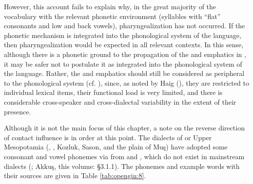\documentclass[output=paper]{langsci/langscibook}
\begin{document}
However, this account fails to explain why, in the great majority of the vocabulary with the relevant phonetic environment (syllables with “flat” consonants and low and back vowels), pharyngealization has not occurred. If the phonetic mechanism is integrated into the phonological system of the language, then pharyngealization would be expected in all relevant contexts. In this sense, although there is a phonetic ground to the propagation of the  and emphatics in , it may be safer not to postulate it as integrated into the phonological system of the language. Rather, the  and emphatics should still be considered as peripheral to the phonological system (cf. \citealt{Haig2007,Anonbyforthcoming}), since, as noted by Haig (\citeyear[167]{Haig2007}), they are restricted to individual lexical items, their functional load is very limited, and there is considerable cross-speaker and cross-dialectal variability in the extent of their presence. 

Although it is not the main focus of this chapter, a note on the reverse direction of contact influence is in order at this point. The  dialects of  or Upper Mesopotamia (, , Kozluk, Sason, and the plain of Muş) have adopted some consonant and vowel phonemes via  from  and , which do not exist in mainstream  dialects (\citealt[84]{Jastrow2011Kurdish}; Akkuş, this volume: §3.1.1). The phonemes and example words with their sources are given in Table \ref{tab:opengin:8}.
\end{document}
